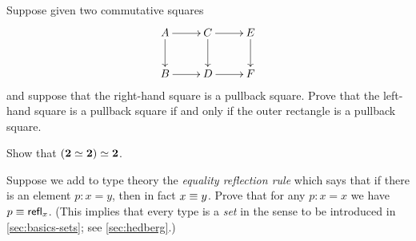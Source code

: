 \begin{ex}\label{ex:pullback-pasting}
  Suppose given two commutative squares
  \begin{equation*}
    \vcenter{\xymatrix{
        A\ar[r]\ar[d] &
        C\ar[r]\ar[d] &
        E\ar[d]\\
        B\ar[r] &
        D\ar[r] &
        F
      }}
  \end{equation*}
  and suppose that the right-hand square is a pullback square.
  Prove that the left-hand square is a pullback square if and only if the outer rectangle is a pullback square.
\end{ex}

\begin{ex}\label{ex:eqvboolbool}
  Show that $(\mathbf{2} \simeq \mathbf{2}) \simeq \mathbf{2}$.
\end{ex}

\begin{ex}\label{ex:equality-reflection}
  Suppose we add to type theory the \emph{equality reflection rule} which says that if there is an element $p:x=y$, then in fact $x\equiv y$.
  Prove that for any $p:x=x$ we have $p\equiv \mathsf{refl}_{x}$.
  (This implies that every type is a \emph{set} in the sense to be introduced in \autoref{sec:basics-sets}; see \autoref{sec:hedberg}.)
\end{ex}

